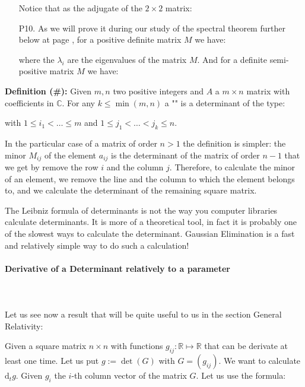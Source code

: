 \begin{enumerate}
		Notice that as the adjugate of the $2\times 2$ matrix:
		
		
		\item[P10.] As we will prove it during our study of the spectral theorem further below at page \pageref{spectral theorem}, for a positive definite matrix $M$ we have:
		
		where the $\lambda_i$ are the eigenvalues of the matrix $M$. And for a definite semi-positive matrix $M$ we have:
		
		 
	\end{enumerate}

	\textbf{Definition (\#\mydef):} Given $m,n$ two positive integers and $A$ a $m\times n$ matrix with coefficients in $\mathbb{C}$. For any $k\leq \min(m,n)$ a "\label{minor}" is a determinant of the type:	
	
	with $1\leq i_1< \ldots \leq m$ and $1\leq j_1 <\ldots <j_k\leq n$.
	
	In the particular case of a matrix of order $n>1$ the definition is simpler: the minor $M_{ij}$ of the element $a_{ij}$ is the determinant of the matrix of order $n-1$ that we get by remove the row $i$ and the column $j$. Therefore, to calculate the minor of an element, we remove the line and the column to which the element belongs to, and we calculate the determinant of the remaining square matrix.
	
	\begin{tcolorbox}[title=Remark,colframe=black,arc=10pt]
	The Leibniz formula of determinants is not the way you computer libraries calculate determinants. It is more of a theoretical tool, in fact it is probably one of the slowest ways to calculate the determinant. Gaussian Elimination is a fast and relatively simple way to do such a calculation!
	\end{tcolorbox}
	
	\paragraph{Derivative of a Determinant relatively to a parameter}\label{derivative of a determinant}\mbox{}\\\\
	Let us see now a result that will be quite useful to us in the section General Relativity:

	Given a square matrix $n\times n$ with functions $g_{ij}:\mathbb{R}\mapsto \mathbb{R}$ that can be derivate at least one time. Let us put $g:=\det(G)$ with $G=(g_{ij})$. We want to calculate $\mathrm{d}_t g$. Given $g_i$ the $i$-th column vector of the matrix $G$. Let us use the formula:
	
